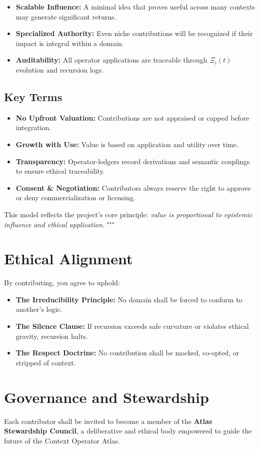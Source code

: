 \documentclass[12pt]{article}
\begin{document}
\begin{itemize}
    \item \textbf{Scalable Influence:} A minimal idea that proves useful across many contexts may generate significant returns.
    \item \textbf{Specialized Authority:} Even niche contributions will be recognized if their impact is integral within a domain.
    \item \textbf{Auditability:} All operator applications are traceable through $\Xi_i(t)$ evolution and recursion logs.
\end{itemize}

\subsection*{Key Terms}
\begin{itemize}
    \item \textbf{No Upfront Valuation:} Contributions are not appraised or capped before integration.
    \item \textbf{Growth with Use:} Value is based on application and utility over time.
    \item \textbf{Transparency:} Operator-ledgers record derivations and semantic couplings to ensure ethical traceability.
    \item \textbf{Consent \& Negotiation:} Contributors always reserve the right to approve or deny commercialization or licensing.
\end{itemize}

This model reflects the project's core principle: \textit{value is proportional to epistemic influence and ethical application}.
"""
\section{Ethical Alignment}
By contributing, you agree to uphold:
\begin{itemize}
    \item \textbf{The Irreducibility Principle:} No domain shall be forced to conform to another’s logic.
    \item \textbf{The Silence Clause:} If recursion exceeds safe curvature or violates ethical gravity, recursion halts.
    \item \textbf{The Respect Doctrine:} No contribution shall be mocked, co-opted, or stripped of context.
\end{itemize}

\section{Governance and Stewardship}
Each contributor shall be invited to become a member of the \textbf{Atlas Stewardship Council}, a deliberative and ethical body empowered to guide the future of the Context Operator Atlas.
\end{document}
